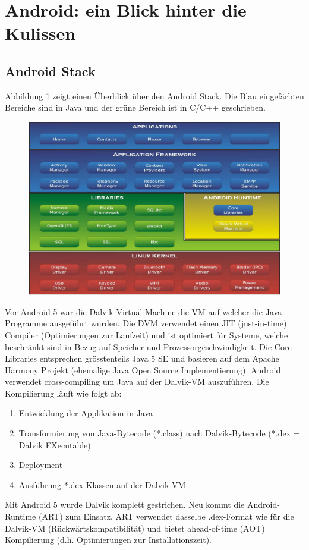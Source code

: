 \section{Android: ein Blick hinter die Kulissen}

\subsection{Android Stack}

Abbildung \ref{fig:android-stack} zeigt einen Überblick über den Android Stack. Die Blau eingefärbten Bereiche sind in Java und der grüne Bereich ist in C/C++ geschrieben.

\begin{figure}
\centering
\includegraphics[width=0.7\linewidth]{fig/android-stack}
\caption{}
\label{fig:android-stack}
\end{figure}

Vor Android 5 war die Dalvik Virtual Machine die VM auf welcher die Java Programme ausgeführt wurden. Die DVM verwendet einen JIT (just-in-time) Compiler (Optimierungen zur Laufzeit) und ist optimiert für Systeme, welche beschränkt sind in Bezug auf Speicher und Prozessorgeschwindigkeit. Die Core Libraries entsprechen grösstenteils Java 5 SE und basieren auf dem Apache Harmony Projekt (ehemalige Java Open Source Implementierung). Android verwendet cross-compiling um Java auf der Dalvik-VM auszuführen. Die Kompilierung läuft wie folgt ab:
\begin{enumerate}
	\item Entwicklung der Applikation in Java
	\item Transformierung von Java-Bytecode (*.class) nach Dalvik-Bytecode (*.dex = Dalvik EXecutable)
	\item Deployment
	\item Ausführung *.dex Klassen auf der Dalvik-VM
\end{enumerate}
Mit Android 5 wurde Dalvik komplett gestrichen. Neu kommt die Android-Runtime (ART) zum Einsatz. ART verwendet dasselbe .dex-Format wie für die Dalvik-VM (Rückwärtskompatibilität) und bietet ahead-of-time (AOT) Kompilierung (d.h. Optimierungen zur Installationszeit).

